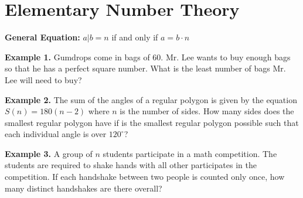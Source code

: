 \documentclass[12pt]{article}
\begin{document}
\section{Elementary Number Theory}

\bigskip
\textbf{General Equation:} $a|b=n$ if and only if $a=b\cdot n$

\vfill
\textbf{Example 1.} Gumdrops come in bags of 60. Mr. Lee wants to buy enough bags so that he has a perfect square number. What is the least number of bags Mr. Lee will need to buy?

\vfill
\textbf{Example 2.} The sum of the angles of a regular polygon is given by the equation $S(n)=180(n-2)$ where $n$ is the number of sides. How many sides does the smallest regular polygon have if is the smallest regular polygon possible such that each individual angle is over $120^\circ$?

\vfill
\textbf{Example 3.} A group of $n$ students participate in a math competition. The students are required to shake hands with all other participates in the competition. If each handshake between two people is counted only once, how many distinct handshakes are there overall?
\end{document}
